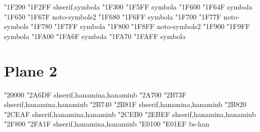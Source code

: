 \documentclass{article}
\begin{document}
                { "1F200} { "1F2FF} {shserif,symbola}
          { "1F300} { "1F5FF} {symbola}
                                      { "1F600} { "1F64F} {symbola}
                            { "1F650} { "1F67F} {noto-symbols2}
                      { "1F680} { "1F6FF} {symbola}
                             { "1F700} { "1F77F} {noto-symbols}
                      { "1F780} { "1F7FF} {symbola}
                          { "1F800} { "1F8FF} {noto-symbols2}
           { "1F900} { "1F9FF} {symbola}
                                  { "1FA00} { "1FA6F} {symbola}
             { "1FA70} { "1FAFF} {symbola}

\section{Plane 2}

             { "20000} { "2A6DF} {shserif,hanamina,hanaminb}
             { "2A700} { "2B73F} {shserif,hanamina,hanaminb}
             { "2B740} { "2B81F} {shserif,hanamina,hanaminb}
             { "2B820} { "2CEAF} {shserif,hanamina,hanaminb}
             { "2CEB0} { "2EBEF} {shserif,hanamina,hanaminb}
        { "2F800} { "2FA1F} {shserif,hanamina,hanaminb}
                 { "E0100} { "E01EF} {bs-han}
\end{document}
